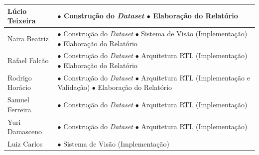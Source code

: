 \begin{xltabular}{\textwidth}{l X}
\midrule
Lúcio Teixeira & $\bullet$ Construção do \textit{Dataset} \newline $\bullet$ Elaboração do Relatório \\
\midrule
Naira Beatriz & $\bullet$ Construção do \textit{Dataset} \newline $\bullet$ Sistema de Visão (Implementação) \newline $\bullet$ Elaboração do Relatório \\
\midrule
Rafael Falcão & $\bullet$ Construção do \textit{Dataset} \newline $\bullet$ Arquitetura RTL (Implementação) \newline $\bullet$ Elaboração do Relatório \\
\midrule
Rodrigo Horácio & $\bullet$ Construção do \textit{Dataset} \newline $\bullet$ Arquitetura RTL (Implementação e Validação) \newline $\bullet$ Elaboração do Relatório \\
\midrule
Samuel Ferreira & $\bullet$ Construção do \textit{Dataset} \newline $\bullet$ Arquitetura RTL (Implementação) \\
\midrule
Yuri Damasceno & $\bullet$ Construção do \textit{Dataset} \newline $\bullet$ Arquitetura RTL (Implementação) \\
\midrule
Luiz Carlos & $\bullet$ Sistema de Visão (Implementação) \\

\end{xltabular}